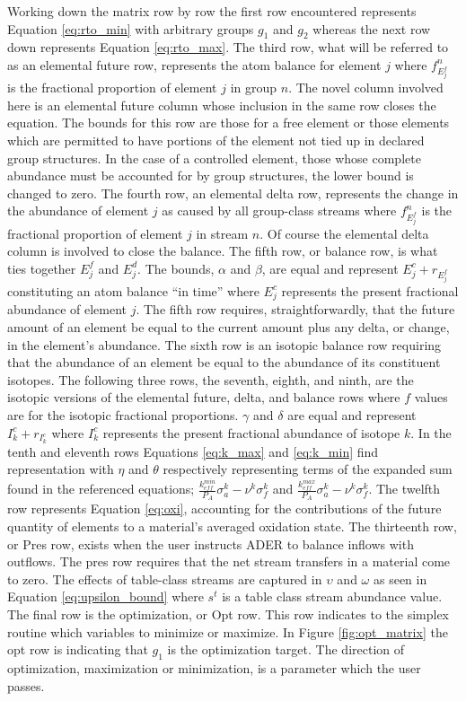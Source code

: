 Working down the matrix row by row the first row encountered represents 
Equation \ref{eq:rto_min} with arbitrary groups $g_{1}$ and $g_{2}$ whereas 
the next row 
down represents Equation \ref{eq:rto_max}. The third row, what will be referred
to as an elemental future row, represents the atom balance for element $j$ where
$f^{n}_{E_{j}^{f}}$ is the fractional proportion of element $j$ in group $n$.
The novel column involved here is an elemental future column whose inclusion
in the same row closes the equation.  
The bounds for this row are those for a
free element or those elements which are permitted to have portions
of the element not tied up in declared group structures. In the case of a
controlled element, those whose complete abundance must be accounted for by
group structures, the lower bound is changed to zero. 
The fourth row, an elemental
delta row, represents the change in the abundance of element $j$
as caused by all group-class streams where
$f^{n}_{E_{j}^{f}}$ is the fractional proportion of element $j$ in stream $n$. 
Of course the elemental delta column 
is involved to close the balance. The fifth row, or balance row, is what ties
together $E_{j}^{f}$ and $E_{j}^{d}$. The bounds, $\alpha$ and $\beta$,
are equal and represent $E_{j}^{c} + r_{E_{j}^{f}}$ constituting an atom
balance ``in time'' where $E_{j}^{c}$ represents the present fractional
abundance of element $j$. The fifth row requires, straightforwardly, that the
future amount of an element be equal to the current amount plus any delta,
or change, in the element's abundance. The sixth row is an isotopic balance row
requiring that the abundance of an element be equal to the abundance of its
constituent isotopes. 
The following three rows, the seventh, eighth, and ninth,
are the isotopic versions of the elemental future, delta, and balance rows 
where $f$ values
are for the isotopic fractional proportions.
$\gamma$ and $\delta$ are
equal and represent $I_{k}^{c} + r_{I_{k}^{c}}$ where $I_{k}^{c}$ represents
the present fractional abundance of isotope $k$. In the tenth and eleventh rows
Equations \ref{eq:k_max} and \ref{eq:k_min} find representation with $\eta$
and $\theta$ respectively representing terms of the expanded sum found in the
referenced equations; $\frac{k_{eff}^{min}}{P_{A}} \sigma_{a}^{k} - \nu^{k}
\sigma_{f}^{k}$ and
$\frac{k_{eff}^{max}}{P_{A}} \sigma_{a}^{k} - \nu^{k}
\sigma_{f}^{k}$. 
The twelfth row represents Equation \ref{eq:oxi}, accounting for the
contributions of the future quantity of elements to a material's averaged
oxidation state.
The thirteenth row, or Pres row, exists
when the user instructs ADER to balance inflows with outflows. The
pres row requires that the net stream transfers in a material come to zero. The
effects of table-class streams are captured in $\upsilon$ and $\omega$ as seen
in Equation \ref{eq:upsilon_bound} where $s^{t}$ is a table class stream 
abundance value. The final row is the optimization, or Opt row. This row
indicates to the simplex routine which variables to minimize or maximize. In
Figure \ref{fig:opt_matrix} the opt row is indicating that $g_{1}$ is the
optimization target. The direction of optimization, maximization or
minimization, is a parameter which the user passes.
    
